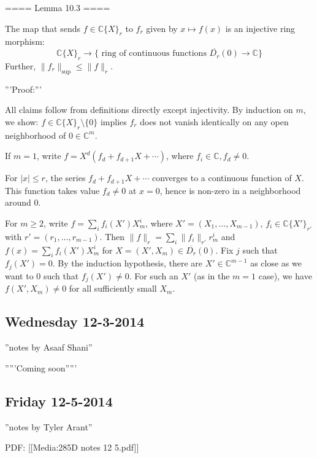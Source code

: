 ==== Lemma 10.3 ====

The map that sends $f\in \mathbb{C}\{X\}_r$ to $f_r$ given by $x\mapsto f(x)$ is an injective ring morphism:
$$\mathbb{C}\{X\}_r \rightarrow \{\textrm{ ring of continuous functions } \overline{D_r}(0) \rightarrow \mathbb{C}\}$$
Further, $\|f_r\|_{\mathrm{sup}} \leq \|f\|_r$.

'''Proof:'''

All claims follow from definitions directly except injectivity. By induction on $m$, we show:
$f\in \mathbb{C}\{X\}_r\setminus \{0\}$ implies $f_r$ does not vanish identically on any open neighborhood of $0\in \mathbb{C}^m$.

If $m=1$, write $f = X^d (f_d + f_{d+1} X + \cdots )$, where $f_i\in \mathbb{C}, f_d\neq 0$.

For $|x|\leq r$, the series $f_d + f_{d+1}X + \cdots $ converges to a continuous function of $X$.
This function takes value $f_d\neq 0$ at $x=0$, hence is non-zero in a neighborhood around $0$.

For $m\geq 2$, write $f = \sum_i f_i(X') X_m^i$, where $X' = (X_1,\ldots, X_{m-1})$, $f_i \in \mathbb{C}\{X'\}_{r'}$
with $r' = (r_1,\ldots, r_{m-1})$.
Then $\|f\|_r = \sum_i \|f_i\|_{r'} r_m^i$ and $f(x) = \sum_i f_i(X')X_m^i$ for $X = (X',X_m)\in \overline{D_r}(0)$.
Fix $j$ such that $f_j(X') = 0$. By the induction hypothesis, there are $X'\in \mathbb{C}^{m-1}$ as close as we want to $0$
such that $f_j(X')\neq 0$. For such an $X'$ (as in the $m=1$ case), we have $f(X',X_m)\neq 0$ for all sufficiently small $X_m$.

\subsection{ Wednesday 12-3-2014 }
''notes by Asaaf Shani''

'''''Coming soon'''''

\subsection{ Friday 12-5-2014 }
''notes by Tyler Arant''

PDF: [[Media:285D notes 12 5.pdf]]
